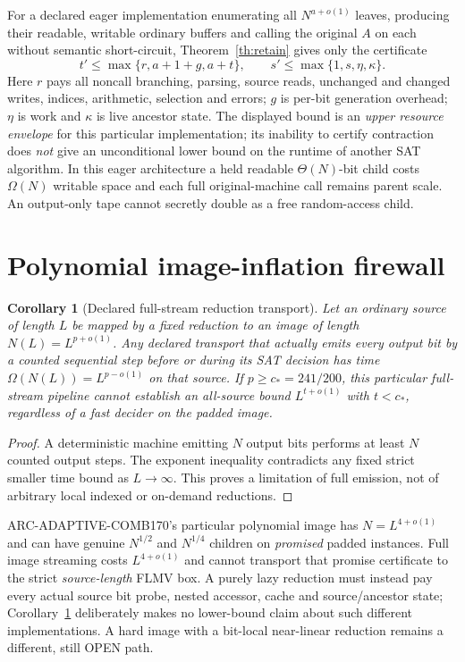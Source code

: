 \documentclass[11pt]{article}
\newtheorem{corollary}[theorem]{Corollary}
\begin{document}
For a declared eager implementation enumerating all $N^{a+o(1)}$ leaves, producing their readable, writable ordinary buffers and calling the original $A$ on each without semantic short-circuit, Theorem~\ref{th:retain} gives only the certificate
\[
t'\le\max\{r,a+1+g,a+t\},\qquad
s'\le\max\{1,s,\eta,\kappa\}.
\]
Here $r$ pays all noncall branching, parsing, source reads, unchanged and changed writes, indices, arithmetic, selection and errors; $g$ is per-bit generation overhead; $\eta$ is work and $\kappa$ is live ancestor state. The displayed bound is an \emph{upper resource envelope} for this particular implementation; its inability to certify contraction does \emph{not} give an unconditional lower bound on the runtime of another SAT algorithm. In this eager architecture a held readable $\Theta(N)$-bit child costs $\Omega(N)$ writable space and each full original-machine call remains parent scale. An output-only tape cannot secretly double as a free random-access child.

\section{Polynomial image-inflation firewall}
\begin{corollary}[Declared full-stream reduction transport]\label{cor:inflate}
Let an ordinary source of length $L$ be mapped by a fixed reduction to an image of length $N(L)=L^{p+o(1)}$. Any declared transport that actually emits \emph{every} output bit by a counted sequential step before or during its SAT decision has time $\Omega(N(L))=L^{p-o(1)}$ on that source. If $p\ge c_*=241/200$, this particular full-stream pipeline cannot establish an all-source bound $L^{t+o(1)}$ with $t<c_*$, regardless of a fast decider on the padded image.
\end{corollary}
\begin{proof}
A deterministic machine emitting $N$ output bits performs at least $N$ counted output steps. The exponent inequality contradicts any fixed strict smaller time bound as $L\to\infty$. This proves a limitation of full emission, not of arbitrary local indexed or on-demand reductions.
\end{proof}

ARC-ADAPTIVE-COMB170's particular polynomial image has $N=L^{4+o(1)}$ and can have genuine $N^{1/2}$ and $N^{1/4}$ children on \emph{promised} padded instances. Full image streaming costs $L^{4+o(1)}$ and cannot transport that promise certificate to the strict \emph{source-length} FLMV box. A purely lazy reduction must instead pay every actual source bit probe, nested accessor, cache and source/ancestor state; Corollary~\ref{cor:inflate} deliberately makes no lower-bound claim about such different implementations. A hard image with a bit-local near-linear reduction remains a different, still OPEN path.
\end{document}
